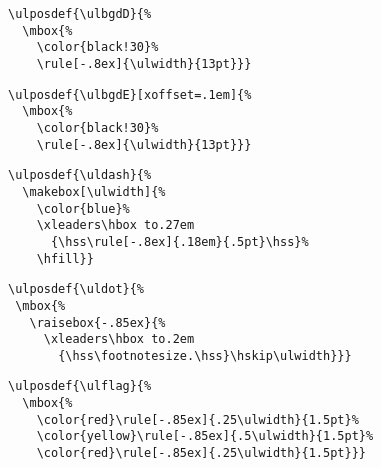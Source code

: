 \documentclass[a4paper,twocolumn]{article}
\begin{document}
\ulpossample\ulpgfC

\begin{verbatim}
\ulposdef{\ulbgdD}{%
  \mbox{%
    \color{black!30}%
    \rule[-.8ex]{\ulwidth}{13pt}}}
\end{verbatim}

\ulposdef\ulbgdD{%
  \mbox{%
    \color{black!30}%
    \rule[-.8ex]{\ulwidth}{13pt}}}

\ulpossample\ulbgdD

\begin{verbatim}
\ulposdef{\ulbgdE}[xoffset=.1em]{%
  \mbox{%
    \color{black!30}%
    \rule[-.8ex]{\ulwidth}{13pt}}}
\end{verbatim}

\ulposdef\ulbgdE[xoffset=.1em]{%
  \mbox{%
    \color{black!30}%
    \rule[-.8ex]{\ulwidth}{13pt}}}

\ulpossample\ulbgdE

\begin{verbatim}
\ulposdef{\uldash}{%
  \makebox[\ulwidth]{%
    \color{blue}%
    \xleaders\hbox to.27em
      {\hss\rule[-.8ex]{.18em}{.5pt}\hss}%
    \hfill}}
\end{verbatim}

\ulposdef{}

\ulpossample\uldash

\begin{verbatim}
\ulposdef{\uldot}{%
 \mbox{%
   \raisebox{-.85ex}{%
     \xleaders\hbox to.2em
       {\hss\footnotesize.\hss}\hskip\ulwidth}}}
\end{verbatim}

\ulposdef{}

\ulpossample\uldot

\begin{verbatim}
\ulposdef{\ulflag}{%
  \mbox{%
    \color{red}\rule[-.85ex]{.25\ulwidth}{1.5pt}%
    \color{yellow}\rule[-.85ex]{.5\ulwidth}{1.5pt}%
    \color{red}\rule[-.85ex]{.25\ulwidth}{1.5pt}}}
\end{verbatim}

\ulposdef\ulflag{%
  \mbox{%
    \color{red}\rule[-.85ex]{.25\ulwidth}{1.5pt}%
    \color{yellow}\rule[-.85ex]{.5\ulwidth}{1.5pt}%
    \color{red}\rule[-.85ex]{.25\ulwidth}{1.5pt}}}

\ulpossample\ulflag
\end{document}
